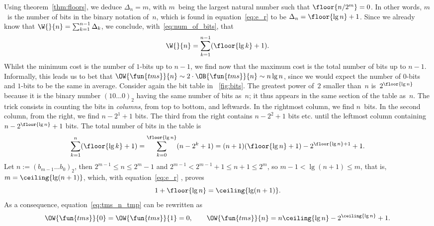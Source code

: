 Using theorem~\vref{thm:floors}, we deduce \(\Delta_n = m\), with
\(m\)~being the largest natural number such that \(\floor{n/2^m} =
0\). In other words, \(m\)~is the number of bits in the binary
notation of~\(n\), which is found in equation~\eqref{eq:e_r} to be
\(\Delta_n = \floor{\lg n} + 1\). Since we already know that \(\W{}{n}
= \sum_{k=1}^{n-1}\Delta_k\), we conclude,
with~\eqref{eq:num_of_bits}, that
\begin{equation}
\W{}{n} = \sum_{k=1}^{n-1}(\floor{\lg k}+1).
\label{eq:tms_n_tmp}
\end{equation}
Whilst the minimum cost is the number of \(1\)-bits up to \(n-1\), we
find now that the maximum cost is the total number of bits up to
\(n-1\). Informally, this leads us to bet that \(\OW{\fun{tms}}{n}
\sim 2 \cdot \OB{\fun{tms}}{n} \sim n\lg n\), since we would expect
the number of \(0\)-bits and \(1\)-bits to be the same in
average. Consider again the bit table in \fig~\vref{fig:bits}. The
greatest power of~\(2\) smaller than~\(n\) is~\(2^{\floor{\lg n}}\)
because it is the binary number \((10\dots0)_2\) having the same
number of bits as~\(n\); it thus appears in the same section of the
table as~\(n\). The trick consists in counting the bits in
\emph{columns}, from top to bottom, and leftwards. In the rightmost
column, we find \(n\)~bits. In the second column, from the right, we
find \(n-2^1+1\) bits. The third from the right contains \(n-2^2+1\)
bits etc. until the leftmost column containing \(n-2^{\floor{\lg
    n}}+1\) bits. The total number of bits in the table is
\begin{equation*}
\abovedisplayskip=2pt
\belowdisplayskip=2pt
\sum_{k=1}^{n}{\!(\floor{\lg k}+1)}
   = \sum_{k=0}^{\floor{\lg n}}{\!(n-2^k+1)}
   = (n + 1)(\floor{\lg n} + 1) - 2^{\floor{\lg n}+1} + 1.
\end{equation*}
Let \(n := (b_{m-1}\dots b_0)_2\), then \(2^{m-1} \leqslant n
\leqslant 2^m - 1\) and \(2^{m-1} < 2^{m-1} + 1 \leqslant n + 1
\leqslant 2^m\), so \(m-1 < \lg(n+1) \leqslant m\), that is, \(m =
\ceiling{\lg(n+1)}\), which, with equation~\eqref{eq:e_r}
, proves
\begin{equation*}
  1 + \floor{\lg n} = \ceiling{\lg(n+1)}.
\end{equation*}
As a consequence, equation~\eqref{eq:tms_n_tmp} can be rewritten as
\begin{equation}
\OW{\fun{tms}}{0} = \OW{\fun{tms}}{1} = 0,
\qquad
\OW{\fun{tms}}{n} = n\ceiling{\lg n} - 2^{\ceiling{\lg n}} + 1.
\label{eq:top}
\end{equation}
